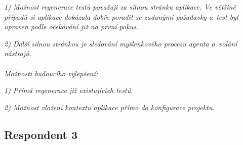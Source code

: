 \documentclass[czech, ing, kiv, he, iso690numb, viewonly]{fasthesis}
\begin{document}
\begin{tcolorbox}[breakable, colback=gray!3, colframe=black!35, boxrule=0.4pt, arc=2pt, title={Google Forms - export odpovědi}]
\textit{1) Možnost regenerace testů považuji za silnou stránku aplikace. Ve většině případů si aplikace dokázala dobře poradit se zadanými požadavky a~test byl upraven podle očekávání již na první pokus.}

\textit{2) Další silnou stránkou je sledování myšlenkového procesu agenta a~volání nástrojů.}
\\\\
\textit{Možnosti budoucího vylepšení:}

\textit{1) Přímá regenerace již existujících testů.}

\textit{2) Možnost vložení kontextu aplikace přímo do konfigurace projektu.}


\end{tcolorbox}

\subsection*{Respondent 3}
\end{document}
